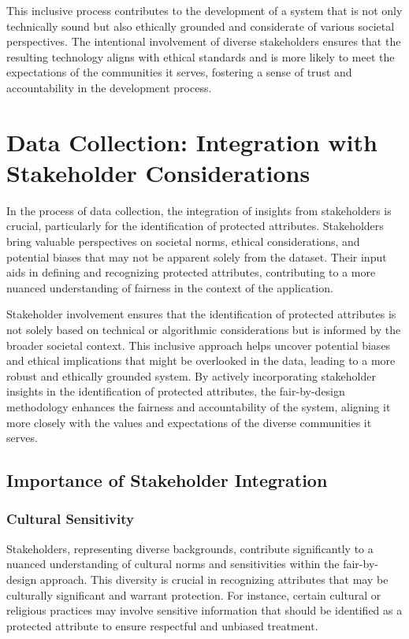 \documentclass[12pt,a4paper,openright,twoside]{book}
\begin{document}
This inclusive process contributes to the development of a system that is not only technically sound but also ethically grounded and considerate of various societal perspectives. The intentional involvement of diverse stakeholders ensures that the resulting technology aligns with ethical standards and is more likely to meet the expectations of the communities it serves, fostering a sense of trust and accountability in the development process.

\section{Data Collection: Integration with Stakeholder Considerations}
\label{section:data-collection}

In the process of data collection, the integration of insights from stakeholders is crucial, particularly for the identification of protected attributes. Stakeholders bring valuable perspectives on societal norms, ethical considerations, and potential biases that may not be apparent solely from the dataset. Their input aids in defining and recognizing protected attributes, contributing to a more nuanced understanding of fairness in the context of the application.

Stakeholder involvement ensures that the identification of protected attributes is not solely based on technical or algorithmic considerations but is informed by the broader societal context. This inclusive approach helps uncover potential biases and ethical implications that might be overlooked in the data, leading to a more robust and ethically grounded system. By actively incorporating stakeholder insights in the identification of protected attributes, the fair-by-design methodology enhances the fairness and accountability of the system, aligning it more closely with the values and expectations of the diverse communities it serves.

\subsection{Importance of Stakeholder Integration}

\subsubsection{Cultural Sensitivity}

Stakeholders, representing diverse backgrounds, contribute significantly to a nuanced understanding of cultural norms and sensitivities within the fair-by-design approach. This diversity is crucial in recognizing attributes that may be culturally significant and warrant protection. For instance, certain cultural or religious practices may involve sensitive information that should be identified as a protected attribute to ensure respectful and unbiased treatment.
\end{document}
